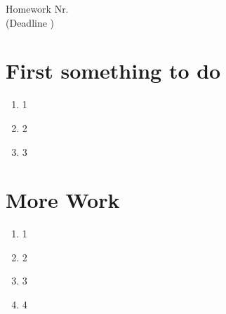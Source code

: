 \documentclass[a4paper]{scrartcl}
\def\header#1#2{
  \begin{center}
    {\Large Homework #1}\\
    {(Deadline #2)}
  \end{center}
}
\begin{document}
    \STUDENTA

    \STUDENTB
    
    \STUDENTC
    
\header{Nr. \NUMBER}{\DEADLINE}




\section{First something to do}
\begin{enumerate}
  \item 1
  \item 2
  \item 3
\end{enumerate}



\section{More Work}
\begin{enumerate}
  \item 1
  \item 2
  \item 3
  \item 4
\end{enumerate}
\end{document}
